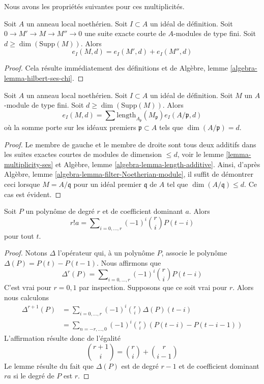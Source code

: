 \noindent
Nous avons les propriétés suivantes pour ces multiplicités.

\begin{lemma}
\label{lemma-multiplicity-ses}
Soit $A$ un anneau local noethérien. Soit $I \subset A$ un idéal de
définition. Soit $0 \to M' \to M \to M'' \to 0$ une suite exacte courte
de $A$-modules de type fini. Soit $d \geq \dim(\text{Supp}(M))$. Alors
$$
e_I(M, d) = e_I(M', d) + e_I(M'', d)
$$
\end{lemma}

\begin{proof}
Cela résulte immédiatement des définitions et de
Algèbre, lemme \ref{algebra-lemma-hilbert-ses-chi}.
\end{proof}

\begin{lemma}
\label{lemma-multiplicity-as-a-sum}
Soit $A$ un anneau local noethérien. Soit $I \subset A$ un idéal de
définition. Soit $M$ un $A$-module de type fini. Soit $d \geq \dim(\text{Supp}(M))$.
Alors
$$
e_I(M, d) =
\sum \text{length}_{A_\mathfrak p}(M_\mathfrak p) e_I(A/\mathfrak p, d)
$$
où la somme porte sur les idéaux premiers $\mathfrak p \subset A$ tels que
$\dim(A/\mathfrak p) = d$.
\end{lemma}

\begin{proof}
Le membre de gauche et le membre de droite sont tous deux additifs dans les suites
exactes courtes de modules de dimension $\leq d$, voir
le lemme \ref{lemma-multiplicity-ses} et
Algèbre, lemme \ref{algebra-lemma-length-additive}.
Ainsi, d'après Algèbre, lemme \ref{algebra-lemma-filter-Noetherian-module},
il suffit de démontrer ceci lorsque $M = A/\mathfrak q$ pour un
idéal premier $\mathfrak q$ de $A$ tel que $\dim(A/\mathfrak q) \leq d$.
Ce cas est évident.
\end{proof}

\begin{lemma}
\label{lemma-leading-coefficient}
Soit $P$ un polynôme de degré $r$ et de coefficient dominant $a$.
Alors
$$
r! a = \sum\nolimits_{i = 0, \ldots, r} (-1)^i{r \choose i} P(t - i)
$$
pour tout $t$.
\end{lemma}

\begin{proof}
Notons $\Delta$ l'opérateur qui, à un polynôme $P$, associe
le polynôme $\Delta(P) = P(t) - P(t - 1)$. Nous affirmons que
$$
\Delta^r(P) = \sum\nolimits_{i = 0, \ldots, r} (-1)^i {r \choose i} P(t - i)
$$
C'est vrai pour $r = 0, 1$ par inspection. Supposons que ce soit vrai pour $r$.
Alors nous calculons
\begin{align*}
\Delta^{r + 1}(P)
& =
\sum\nolimits_{i = 0, \ldots, r} (-1)^i {r \choose i} \Delta(P)(t - i) \\
& =
\sum\nolimits_{n = -r, \ldots, 0} (-1)^i {r \choose i}
(P(t - i) - P(t - i - 1))
\end{align*}
L'affirmation résulte donc de l'égalité
$$
{r + 1 \choose i} = {r \choose i} + {r \choose i - 1}
$$
Le lemme résulte du fait que $\Delta(P)$ est de degré $r - 1$
et de coefficient dominant $ra$ si le degré de $P$ est $r$.
\end{proof}

